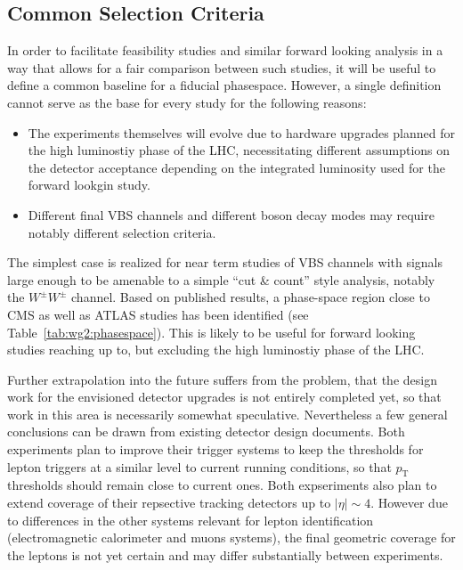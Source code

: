 \subsection{Common Selection Criteria}

In order to facilitate feasibility studies and similar forward looking analysis in a way that allows for a fair comparison between such studies, it will be useful to define a common baseline for a fiducial phasespace. However, a single definition cannot serve as the base for every study for the following reasons:
\begin{itemize}
\item The experiments themselves will evolve due to hardware upgrades planned for the high luminostiy phase of the LHC, necessitating different assumptions on the detector acceptance depending on the integrated luminosity used for the forward lookgin study.
\item Different final VBS channels and different boson decay modes may require notably different selection criteria.
\end{itemize}

The simplest case is realized for near term studies of VBS channels with signals large enough to be amenable to a simple ``cut \& count'' style analysis, notably the $W^\pm W^\pm$ channel. Based on published results, a phase-space region close to CMS as well as ATLAS studies has been identified (see Table~\ref{tab:wg2:phasespace}). This is likely to be useful for forward looking studies reaching up to, but excluding the high luminostiy phase of the LHC.

Further extrapolation into the future suffers from the problem, that the design work for the envisioned detector upgrades is not entirely completed yet, so that work in this area is necessarily somewhat speculative. Nevertheless a few general conclusions can be drawn from existing detector design documents. Both experiments plan to improve their trigger systems to keep the thresholds for lepton triggers at a similar level to current running conditions, so that $p_{\mathrm{T}}$ thresholds should remain close to current ones. Both expseriments also plan to extend coverage of their repsective tracking detectors up to $|\eta|\sim 4$. However due to differences in the other systems relevant for lepton identification (electromagnetic calorimeter and muons systems), the final geometric coverage for the leptons is not yet certain and may differ substantially between experiments.

